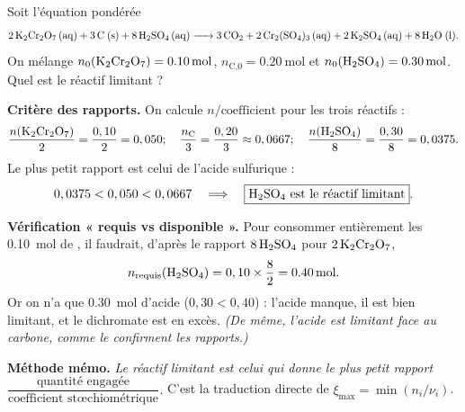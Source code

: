 \documentclass[11pt,a4paper]{article}
\newcommand{\nq}[1]{n_{\text{#1}}}        %
\begin{document}
\begin{exemple}
Soit l'équation pondérée
\[
\ce{2 K2Cr2O7 (aq) + 3 C (s) + 8 H2SO4 (aq) -> 3 CO2 + 2 Cr2(SO4)3 (aq) + 2 K2SO4 (aq) + 8 H2O (l)}.
\]
On mélange $n_0(\ce{K2Cr2O7})=\SI{0,10}{\mole}$, $\nq{C,0}=\SI{0,20}{\mole}$ et
$n_0(\ce{H2SO4})=\SI{0,30}{\mole}$. Quel est le réactif limitant ?

\smallskip
\textbf{Critère des rapports.} On calcule $n/\text{coefficient}$ pour les trois réactifs :
\[
\frac{n(\ce{K2Cr2O7})}{2}=\frac{0,10}{2}=0,050 ;\quad
\frac{\nq{C}}{3}=\frac{0,20}{3}\approx0,0667 ;\quad
\frac{n(\ce{H2SO4})}{8}=\frac{0,30}{8}=0,0375 .
\]
Le plus petit rapport est celui de l'acide sulfurique :
\[
0,0375<0,050<0,0667\quad\Longrightarrow\quad \boxed{\text{\ce{H2SO4} est le réactif limitant}}.
\]

\textbf{Vérification « requis vs disponible ».} Pour consommer entièrement les \SI{0,10}{\mole} de
, il faudrait, d'après le rapport $8\,\ce{H2SO4}$ pour $2\,\ce{K2Cr2O7}$,
\[
n_{\text{requis}}(\ce{H2SO4})=0,10\times\frac{8}{2}=\SI{0,40}{\mole}.
\]
Or on n'a que \SI{0,30}{\mole} d'acide ($0,30<0,40$) : l'acide manque, il est bien limitant, et le
dichromate est en excès. \emph{(De même, l'acide est limitant face au carbone, comme le confirment
les rapports.)}

\textbf{Méthode mémo.} \emph{Le réactif limitant est celui qui donne le plus petit rapport
$\dfrac{\text{quantité engagée}}{\text{coefficient stœchiométrique}}$.} C'est la traduction directe
de $\xi_{\max}=\min(n_i/\nu_i)$.
\end{exemple}
\end{document}
